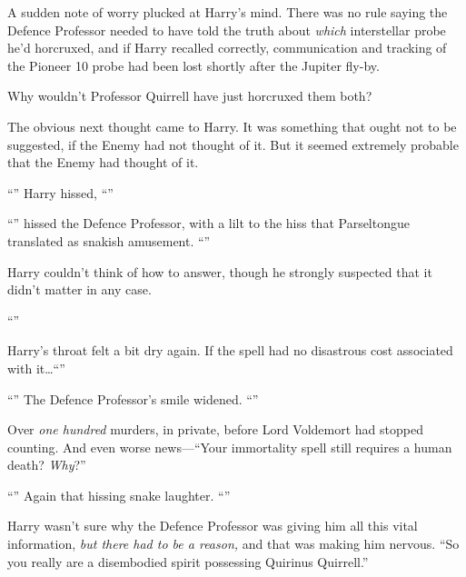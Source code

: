 A sudden note of worry plucked at Harry’s mind. There was no rule saying the Defence Professor needed to have told the truth about \emph{which} interstellar probe he’d horcruxed, and if Harry recalled correctly, communication and tracking of the Pioneer 10 probe had been lost shortly after the Jupiter fly-by.

Why wouldn’t Professor Quirrell have just horcruxed them both?

The obvious next thought came to Harry. It was something that ought not to be suggested, if the Enemy had not thought of it. But it seemed extremely probable that the Enemy had thought of it.

“” Harry hissed, “”

“” hissed the Defence Professor, with a lilt to the hiss that Parseltongue translated as snakish amusement. “”

Harry couldn’t think of how to answer, though he strongly suspected that it didn’t matter in any case.

“”

Harry’s throat felt a bit dry again. If the spell had no disastrous cost associated with it…“”

“” The Defence Professor’s smile widened. “”

Over \emph{one hundred} murders, in private, before Lord Voldemort had stopped counting. And even worse news—“Your immortality spell still requires a human death? \emph{Why}?”

“” Again that hissing snake laughter. “”

Harry wasn’t sure why the Defence Professor was giving him all this vital information, \emph{but there had to be a reason,} and that was making him nervous. “So you really are a disembodied spirit possessing Quirinus Quirrell.”

